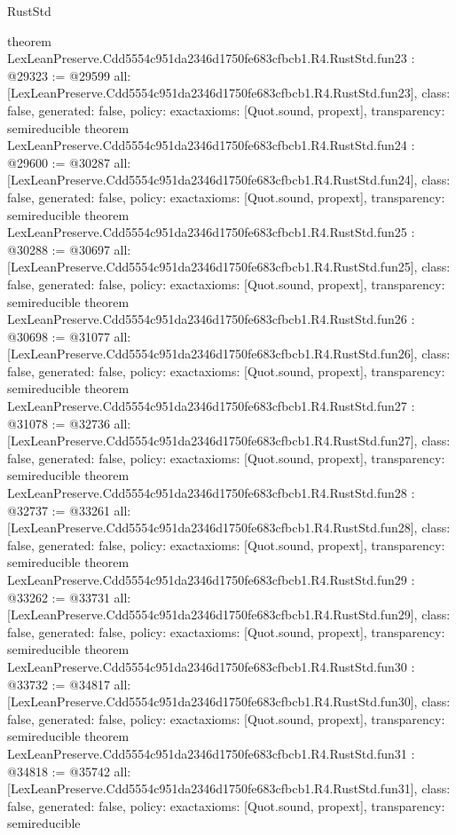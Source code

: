 \begin{lexlean}{RustStd}
\begin{coremodule}
{}
theorem LexLeanPreserve.Cdd5554c951da2346d1750fe683cfbcb1.R4.RustStd.fun23 : @29323 := @29599 {
  all: [LexLeanPreserve.Cdd5554c951da2346d1750fe683cfbcb1.R4.RustStd.fun23],
  class: false,
  generated: false,
  policy: exact{axioms: [Quot.sound, propext]},
  transparency: semireducible
}
theorem LexLeanPreserve.Cdd5554c951da2346d1750fe683cfbcb1.R4.RustStd.fun24 : @29600 := @30287 {
  all: [LexLeanPreserve.Cdd5554c951da2346d1750fe683cfbcb1.R4.RustStd.fun24],
  class: false,
  generated: false,
  policy: exact{axioms: [Quot.sound, propext]},
  transparency: semireducible
}
theorem LexLeanPreserve.Cdd5554c951da2346d1750fe683cfbcb1.R4.RustStd.fun25 : @30288 := @30697 {
  all: [LexLeanPreserve.Cdd5554c951da2346d1750fe683cfbcb1.R4.RustStd.fun25],
  class: false,
  generated: false,
  policy: exact{axioms: [Quot.sound, propext]},
  transparency: semireducible
}
theorem LexLeanPreserve.Cdd5554c951da2346d1750fe683cfbcb1.R4.RustStd.fun26 : @30698 := @31077 {
  all: [LexLeanPreserve.Cdd5554c951da2346d1750fe683cfbcb1.R4.RustStd.fun26],
  class: false,
  generated: false,
  policy: exact{axioms: [Quot.sound, propext]},
  transparency: semireducible
}
theorem LexLeanPreserve.Cdd5554c951da2346d1750fe683cfbcb1.R4.RustStd.fun27 : @31078 := @32736 {
  all: [LexLeanPreserve.Cdd5554c951da2346d1750fe683cfbcb1.R4.RustStd.fun27],
  class: false,
  generated: false,
  policy: exact{axioms: [Quot.sound, propext]},
  transparency: semireducible
}
theorem LexLeanPreserve.Cdd5554c951da2346d1750fe683cfbcb1.R4.RustStd.fun28 : @32737 := @33261 {
  all: [LexLeanPreserve.Cdd5554c951da2346d1750fe683cfbcb1.R4.RustStd.fun28],
  class: false,
  generated: false,
  policy: exact{axioms: [Quot.sound, propext]},
  transparency: semireducible
}
theorem LexLeanPreserve.Cdd5554c951da2346d1750fe683cfbcb1.R4.RustStd.fun29 : @33262 := @33731 {
  all: [LexLeanPreserve.Cdd5554c951da2346d1750fe683cfbcb1.R4.RustStd.fun29],
  class: false,
  generated: false,
  policy: exact{axioms: [Quot.sound, propext]},
  transparency: semireducible
}
theorem LexLeanPreserve.Cdd5554c951da2346d1750fe683cfbcb1.R4.RustStd.fun30 : @33732 := @34817 {
  all: [LexLeanPreserve.Cdd5554c951da2346d1750fe683cfbcb1.R4.RustStd.fun30],
  class: false,
  generated: false,
  policy: exact{axioms: [Quot.sound, propext]},
  transparency: semireducible
}
theorem LexLeanPreserve.Cdd5554c951da2346d1750fe683cfbcb1.R4.RustStd.fun31 : @34818 := @35742 {
  all: [LexLeanPreserve.Cdd5554c951da2346d1750fe683cfbcb1.R4.RustStd.fun31],
  class: false,
  generated: false,
  policy: exact{axioms: [Quot.sound, propext]},
  transparency: semireducible
}
\end{coremodule}
\end{lexlean}
